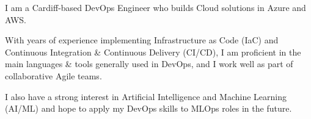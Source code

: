 
\begin{small}

  \vspace{0.25cm}

  I am a Cardiff-based DevOps Engineer who builds Cloud solutions in Azure and AWS.
  \vspace{0.25cm}

  With years of experience implementing Infrastructure as Code (IaC) and Continuous Integration \& Continuous Delivery (CI/CD),
  I am proficient in the main languages \& tools generally used in DevOps,
  and I work well as part of collaborative Agile teams.
  \vspace{0.25cm}

  I also have a strong interest in Artificial Intelligence and Machine Learning (AI/ML) and hope to apply my DevOps skills to MLOps roles in the future.

\end{small}

